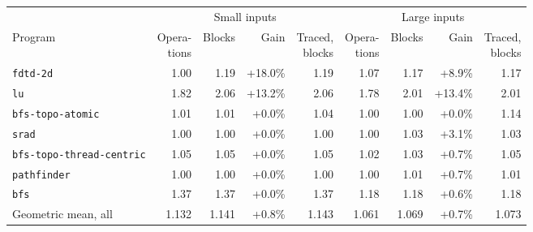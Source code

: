 \begin{tabular}{lrrrrrrrr}
\toprule
 & \multicolumn{4}{c}{Small inputs} & \multicolumn{4}{c}{Large inputs} \\
\cmidrule(lr){2-5} \cmidrule(lr){6-9}
Program & \shortstack{Opera-\\tions} & Blocks & Gain & \shortstack{Traced,\\blocks} & \shortstack{Opera-\\tions} & Blocks & Gain & \shortstack{Traced,\\blocks} \\
\midrule
\texttt{fdtd-2d} & 1.00 & 1.19 & +18.0\% & 1.19 & 1.07 & 1.17 & +8.9\% & 1.17 \\
\texttt{lu} & 1.82 & 2.06 & +13.2\% & 2.06 & 1.78 & 2.01 & +13.4\% & 2.01 \\
\texttt{bfs-topo-atomic} & 1.01 & 1.01 & +0.0\% & 1.04 & 1.00 & 1.00 & +0.0\% & 1.14 \\
\texttt{srad} & 1.00 & 1.00 & +0.0\% & 1.00 & 1.00 & 1.03 & +3.1\% & 1.03 \\
\texttt{bfs-topo-thread-centric} & 1.05 & 1.05 & +0.0\% & 1.05 & 1.02 & 1.03 & +0.7\% & 1.05 \\
\texttt{pathfinder} & 1.00 & 1.00 & +0.0\% & 1.00 & 1.00 & 1.01 & +0.7\% & 1.01 \\
\texttt{bfs} & 1.37 & 1.37 & +0.0\% & 1.37 & 1.18 & 1.18 & +0.6\% & 1.18 \\
\midrule
Geometric mean, all & 1.132 & 1.141 & +0.8\% & 1.143 & 1.061 & 1.069 & +0.7\% & 1.073 \\
\bottomrule
\end{tabular}
